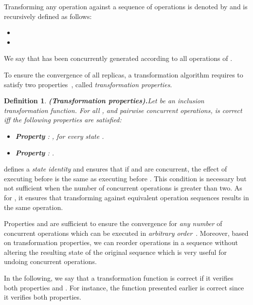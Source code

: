 \documentclass[submission,copyright,creativecommons]{eptcs}
\newtheorem{definition}{Definition}
\begin{document}
Transforming  any operation   against a sequence of operations   is  denoted by
 and is recursively defined as follows:\begin{itemize}\vspace{-1mm}
\item \vspace{-2mm}
\item 
\end{itemize}\vspace{-1mm}
We say that  has been concurrently generated according to all
operations of .




To ensure the convergence of all replicas, a transformation algorithm requires to   satisfy   two
properties~\cite{Ressel.ea:96,Sun02}, called \emph{transformation properties}.

\begin{definition}\textbf{\emph{(Transformation properties).}}\label{Def:TP1TP2}
Let  be an inclusion transformation function. For all   ,  and 
pairwise concurrent operations,  is \emph{correct} iff the following properties are
satisfied: 
\begin{itemize}
\item \textbf{Property }: , for every state .
\item \textbf{Property }:
        .

\end{itemize}
\end{definition}

 defines a  \emph{state identity} and ensures that  if  and
 are concurrent, the effect of executing  before  is
the  same  as  executing    before  .  This  condition  is
necessary but not sufficient  when the number of concurrent operations
is greater than two.  As  for , it ensures that transforming 
against equivalent  operation sequences  results in  the same operation.


Properties   and  are  sufficient to ensure  the convergence
for \textit{any number} of concurrent operations which can be
executed in \textit{arbitrary order}~\cite{Ressel.ea:96,Lus03}. Moreover, based on transformation properties, we can reorder operations in a sequence without altering
the resulting state of the original sequence which is very useful for undoing concurrent operations.

In the following, we say that a transformation function  is correct if it verifies both properties  and . 
For instance, the    function  presented earlier  is correct since it verifies both properties.
\end{document}
